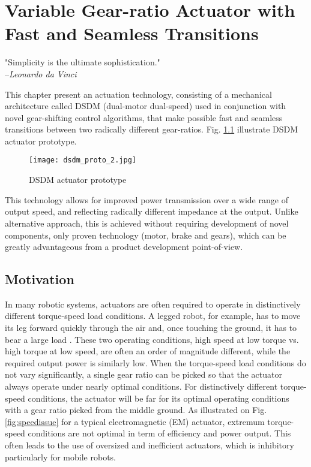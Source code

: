 \chapter{Variable Gear-ratio Actuator with Fast and Seamless Transitions }
\label{sec:MultipleSpeedActuationTechnology}

\begin{flushright}
"Simplicity is the ultimate sophistication." \\ --\emph{Leonardo da Vinci}
\end{flushright}

This chapter present an actuation technology, consisting of a mechanical architecture called DSDM (dual-motor dual-speed) used in conjunction with novel gear-shifting control algorithms, that make possible fast and seamless transitions between two radically different gear-ratios. Fig. \ref{fig:dsdm_proto} illustrate DSDM actuator prototype. 

\begin{figure}[H]
	\centering
		\texttt{[image: dsdm\_proto\_2.jpg]}
	\caption{DSDM actuator prototype}
	\label{fig:dsdm_proto}
\end{figure}

This technology allows for improved power transmission over a wide range of output speed, and reflecting radically different impedance at the output. Unlike alternative approach, this is achieved without requiring development of novel components, only proven technology (motor, brake and gears), which can be greatly advantageous from a product development point-of-view. 

\section{Motivation}
\label{sec:mot}

In many robotic systems, actuators are often required to operate in distinctively different torque-speed load conditions. A legged robot, for example, has to move its leg forward quickly through the air and, once touching the ground, it has to bear a large load \cite{hirose_study_1984}. These two operating conditions, high speed at low torque vs. high torque at low speed, are often an order of magnitude different, while the required output power is similarly low. When the torque-speed load conditions do not vary significantly, a single gear ratio can be picked so that the actuator always operate under nearly optimal conditions. For distinctively different torque-speed conditions, the actuator will be far for its optimal operating conditions with a gear ratio picked from the middle ground. As illustrated on Fig. \ref{fig:speedissue} for a typical electromagnetic (EM) actuator, extremum torque-speed conditions are not optimal in term of efficiency and power output. This often leads to the use of oversized and inefficient actuators, which is inhibitory particularly for mobile robots.

